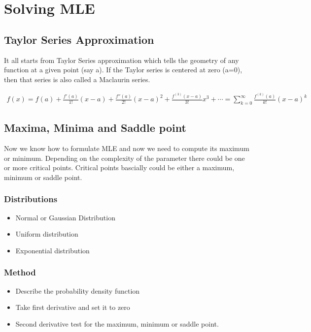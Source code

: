 \chapter{Solving MLE}

\section{Taylor Series Approximation}

It all starts from Taylor Series approximation which tells the geometry of any function at a given point (say a). If the Taylor series is centered at zero (a=0), then that series is also called a Maclaurin series. 

\begin{equation}
\begin{split}
f(x) = f(a) + \frac{f'(a)}{1!}(x-a) + \frac{f''(a)}{2!}(x-a)^2 + \frac{f^{(3)}(x-a)}{3!}x^3 + \dotsb = \sum_{k=0}^\infty \frac{f^{\left(k\right)}(a)}{k!} (x-a)^k
\end{split}
\end{equation}

  
\section{Maxima, Minima and Saddle point}
Now we know how to formulate MLE and now we need to compute its maximum or minimum. Depending on the complexity of the parameter there could be one or more critical points. Critical points bascially could be either a maximum, minimum or saddle point. 

\subsection{Distributions}
\begin{itemize}
    \item Normal or Gaussian Distribution
    \item Uniform distribution
    \item Exponential distribution
\end{itemize}



\subsection{Method}
\begin{itemize}
  \item Describe the probability density function
  \item Take first derivative and set it to zero
  \item Second derivative test for the maximum, minimum or saddle point. 
\end{itemize}


